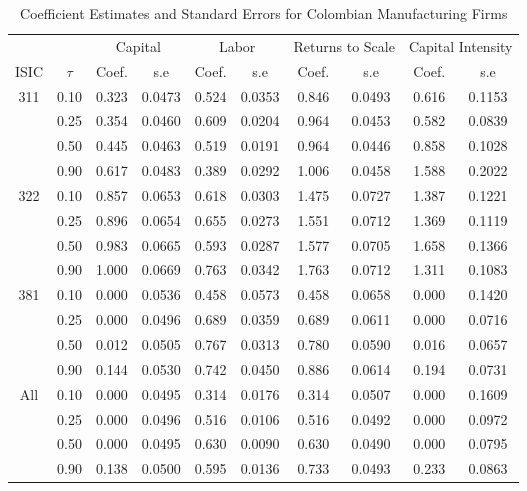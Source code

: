 \begin{table}[ht]
\centering
\caption{Coefficient Estimates and Standard Errors for Colombian Manufacturing Firms} 
\begin{tabular}{cccccccccc}
  \hline\hline & & \multicolumn{2}{c}{Capital}  & \multicolumn{2}{c}{Labor} & \multicolumn{2}{c}{Returns to Scale} & \multicolumn{2}{c}{Capital Intensity}\\ \cmidrule(lr){3-4} \cmidrule(lr){5-6} \cmidrule(lr){7-8} \cmidrule(lr){9-10}ISIC & $\tau$ & Coef. & s.e & Coef. & s.e & Coef. & s.e & Coef. & s.e \\ 
  \hline
311 & 0.10 & 0.323 & 0.0473 & 0.524 & 0.0353 & 0.846 & 0.0493 & 0.616 & 0.1153 \\ 
   & 0.25 & 0.354 & 0.0460 & 0.609 & 0.0204 & 0.964 & 0.0453 & 0.582 & 0.0839 \\ 
   & 0.50 & 0.445 & 0.0463 & 0.519 & 0.0191 & 0.964 & 0.0446 & 0.858 & 0.1028 \\ 
   & 0.90 & 0.617 & 0.0483 & 0.389 & 0.0292 & 1.006 & 0.0458 & 1.588 & 0.2022 \\ 
  322 & 0.10 & 0.857 & 0.0653 & 0.618 & 0.0303 & 1.475 & 0.0727 & 1.387 & 0.1221 \\ 
   & 0.25 & 0.896 & 0.0654 & 0.655 & 0.0273 & 1.551 & 0.0712 & 1.369 & 0.1119 \\ 
   & 0.50 & 0.983 & 0.0665 & 0.593 & 0.0287 & 1.577 & 0.0705 & 1.658 & 0.1366 \\ 
   & 0.90 & 1.000 & 0.0669 & 0.763 & 0.0342 & 1.763 & 0.0712 & 1.311 & 0.1083 \\ 
  381 & 0.10 & 0.000 & 0.0536 & 0.458 & 0.0573 & 0.458 & 0.0658 & 0.000 & 0.1420 \\ 
   & 0.25 & 0.000 & 0.0496 & 0.689 & 0.0359 & 0.689 & 0.0611 & 0.000 & 0.0716 \\ 
   & 0.50 & 0.012 & 0.0505 & 0.767 & 0.0313 & 0.780 & 0.0590 & 0.016 & 0.0657 \\ 
   & 0.90 & 0.144 & 0.0530 & 0.742 & 0.0450 & 0.886 & 0.0614 & 0.194 & 0.0731 \\ 
  All & 0.10 & 0.000 & 0.0495 & 0.314 & 0.0176 & 0.314 & 0.0507 & 0.000 & 0.1609 \\ 
   & 0.25 & 0.000 & 0.0496 & 0.516 & 0.0106 & 0.516 & 0.0492 & 0.000 & 0.0972 \\ 
   & 0.50 & 0.000 & 0.0495 & 0.630 & 0.0090 & 0.630 & 0.0490 & 0.000 & 0.0795 \\ 
   & 0.90 & 0.138 & 0.0500 & 0.595 & 0.0136 & 0.733 & 0.0493 & 0.233 & 0.0863 \\ 
   \hline
\end{tabular}
\end{table}
